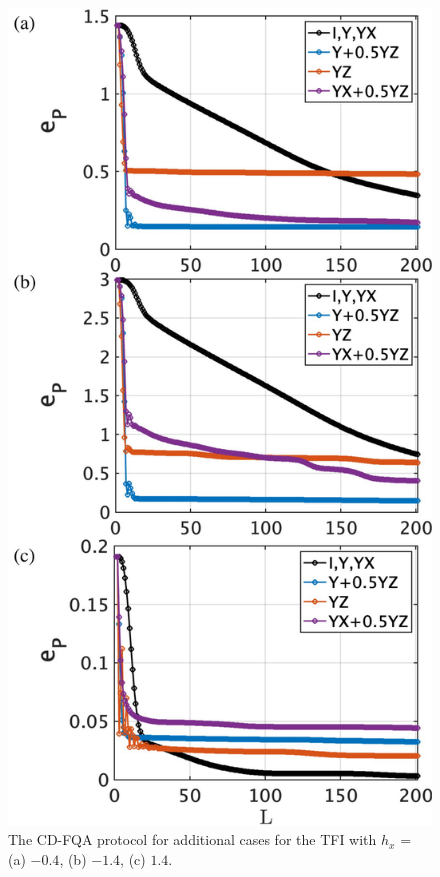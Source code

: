 \documentclass[twocolumn,aps,superscriptaddress,floatfix,longbibliography]{revtex4-2}
\begin{document}
\begin{figure}[tb]
    \centering
    \includegraphics[width=0.85\linewidth]{TFIadd.pdf} %
\caption{
   The CD-FQA protocol for additional cases for the TFI with
   $h_x$ = (a) $-0.4$, (b) $-1.4$,  (c) $1.4$.
}\label{fig:TFIappendix1}
\end{figure}
\end{document}
